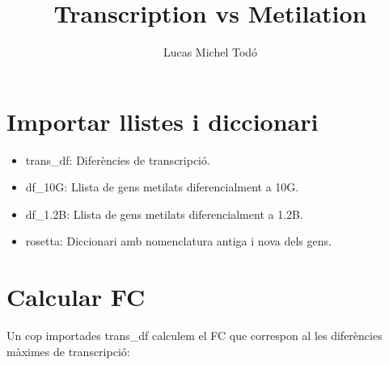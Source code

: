 \documentclass{article}\usepackage[]{graphicx}\usepackage[]{color}
\begin{document}
\title{Transcription vs Metilation}
\author{Lucas Michel Todó}
\maketitle
\tableofcontents

\section{Importar llistes i diccionari}

\begin{itemize}
\item trans\_df: Diferències de transcripci\'{o}.
\item df\_10G: Llista de gens metilats diferencialment a 10G.
\item df\_1.2B: Llista de gens metilats diferencialment a 1.2B.
\item rosetta: Diccionari amb nomenclatura antiga i nova dels gens.
\end{itemize}




\section{Calcular FC}
Un cop importades trans\_df calculem el FC que correspon al les diferències màximes de transcripció:
\end{document}
